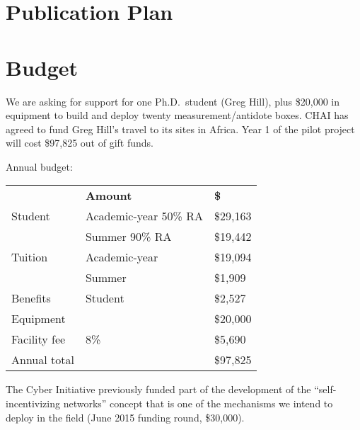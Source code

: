 \documentclass[11pt]{article}
\newcommand{\slim}{\vspace{\baselineskip}}
\begin{document}
\section{Publication Plan}

\section{Budget}

We are asking for support for one Ph.D.~student (Greg Hill), plus
\$20,000 in equipment to build and deploy twenty measurement/antidote
boxes. CHAI has agreed to fund Greg Hill's travel to its sites in
Africa. Year 1 of the pilot project will cost \$97,825 out of gift
funds.

\slim

\noindent Annual budget:

\slim

\noindent \begin{tabular}{ll|l}
& \bf Amount & \bf \$ \\
Student & Academic-year 50\% RA & \$29,163 \\
        & Summer 90\% RA & \$19,442 \\

Tuition & Academic-year & \$19,094 \\
        & Summer        & \$1,909 \\

Benefits & Student & \$2,527 \\

Equipment &         & \$20,000 \\

\hline

Facility fee & 8\% & \$5,690 \\
Annual total & & \$97,825 \\

\end{tabular}

\slim

The Cyber Initiative previously funded part of the development of the
``self-incentivizing networks'' concept that is one of the mechanisms
we intend to deploy in the field (June 2015 funding round, \$30,000).

{\footnotesize



}
\end{document}
